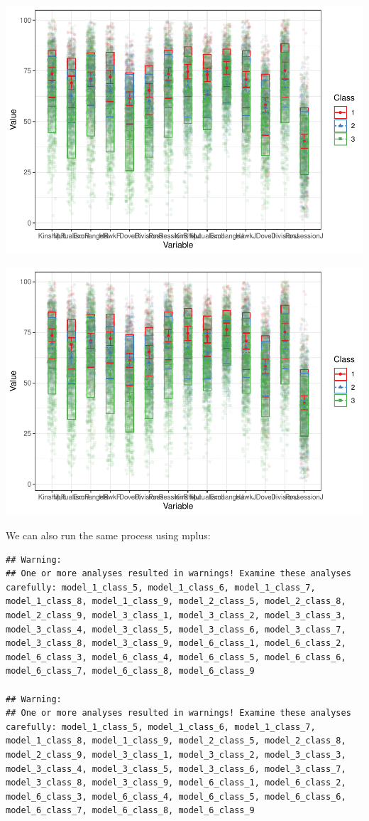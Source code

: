 \documentclass[man]{apa6}
\begin{document}
\includegraphics{paper_files/figure-latex/m6p7-solution-1.pdf}

\includegraphics{paper_files/figure-latex/m6p2-solution-1.pdf}

We can also run the same process using mplus:

\begin{verbatim}
## Warning: 
## One or more analyses resulted in warnings! Examine these analyses carefully: model_1_class_5, model_1_class_6, model_1_class_7, model_1_class_8, model_1_class_9, model_2_class_5, model_2_class_8, model_2_class_9, model_3_class_1, model_3_class_2, model_3_class_3, model_3_class_4, model_3_class_5, model_3_class_6, model_3_class_7, model_3_class_8, model_3_class_9, model_6_class_1, model_6_class_2, model_6_class_3, model_6_class_4, model_6_class_5, model_6_class_6, model_6_class_7, model_6_class_8, model_6_class_9

## Warning: 
## One or more analyses resulted in warnings! Examine these analyses carefully: model_1_class_5, model_1_class_6, model_1_class_7, model_1_class_8, model_1_class_9, model_2_class_5, model_2_class_8, model_2_class_9, model_3_class_1, model_3_class_2, model_3_class_3, model_3_class_4, model_3_class_5, model_3_class_6, model_3_class_7, model_3_class_8, model_3_class_9, model_6_class_1, model_6_class_2, model_6_class_3, model_6_class_4, model_6_class_5, model_6_class_6, model_6_class_7, model_6_class_8, model_6_class_9
\end{verbatim}
\end{document}
